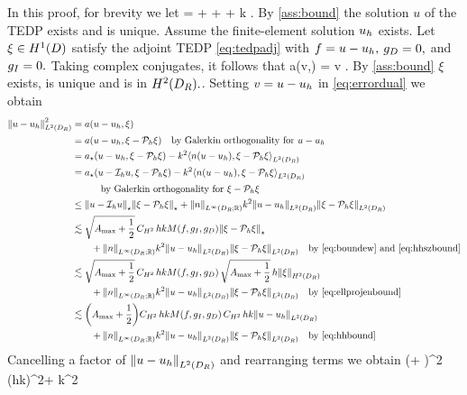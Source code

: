 In this proof, for brevity we let
\beqs
\rhs =  + \Nunsure{\gI} + \NLtGD{\gradGD \gD} + k \NLtGD{\gD}.
\eeqs
By \cref{ass:bound} the solution $u$ of the TEDP exists and is unique. Assume the finite-element solution $u_{h}$ exists. Let $\xi \in \HoD$ satisfy the adjoint TEDP \eqref{eq:tedpadj} with $f=u-u_{h},$ $g_{D}=0,$ and $g_{I}=0.$ Taking complex conjugates, it follows that
\beq\label{eq:errordual}
a(v,\xi) =  \tfa v \in \HoDR.
\eeq
By \cref{ass:bound} $\xi$ exists, is unique and is in $\HtDR.$. Setting $v = u-u_{h}$ in \eqref{eq:errordual} we obtain
\begin{align*}
  \NLtDR{u-\uh}^2 &= a\mleft(u-\uh,\xi\mright)\\
                 &= a\mleft(u-\uh,\xi-\Ph \xi\mright) \quad\text{by Galerkin orthogonality for } u-\uh\\
                 &= \api\mleft(u-\uh,\xi-\Ph \xi\mright) - k^2 \IPLtDR{n\mleft(u-\uh\mright)}{\xi-\Ph \xi}\\
                 &= \api\mleft(u-\Ih u,\xi-\Ph \xi\mright) - k^2 \IPLtDR{n\mleft(u-\uh\mright)}{\xi-\Ph \xi}\\
  &\quad\quad\quad\text{by Galerkin orthogonality for }\xi  - \Ph \xi\\
                 &\leq \Npi{u-\Ih u}\Npi{\xi - \Ph \xi} + \NLiDRRR{n} k^2 \NLtDR{u-\uh}\NLtDR{\xi-\Ph \xi}\\
                 &\lesssim \sqrt{\Amax + \half}\, \CHthh\, hk \rhs\Npi{\xi-\Ph \xi}\\
  &\quad\quad+  \NLiDRRR{n} k^2 \NLtDR{u-\uh}\NLtDR{\xi-\Ph \xi}\quad \text{by \eqref{eq:boundew} and \eqref{eq:hhszbound}}\\
                 &\lesssim \sqrt{\Amax + \half}\, \CHthh\, hk\rhs\,\sqrt{\Amax + \half}\,h\NHtDR{\xi}\\
                 &\quad\quad  + \NLiDRRR{n} k^2 \NLtDR{u-\uh}\NLtDR{\xi-\Ph \xi}\quad \text{by \eqref{eq:ellprojenbound}}\\
                 &\lesssim \mleft(\Amax + \half\mright)\CHthh\, hk\rhs \, \CHthh \,hk \NLtDR{u-\uh}\\
&\quad\quad  + \NLiDRRR{n} k^2 \NLtDR{u-\uh}\NLtDR{\xi-\Ph \xi}\quad \text{by \eqref{eq:hhbound}}\\
\end{align*}
Cancelling a factor of $\NLtDR{u-\uh}$ and rearranging terms we obtain
\beqs
{} \lesssim \mleft(\Amax + \half\mright)\CHthh^2 \mleft(hk\mright)^2\rhs + k^2  \NLtDR{\xi - \Ph \xi}
\eeqs
